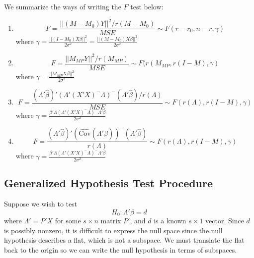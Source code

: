 \documentclass[12pt]{article}
\newcommand{\Cov}{\mathrm{Cov}}
\newcommand{\bhat}{\hat{\beta}}
\numberwithin{equation}{section}
\begin{document}
We summarize the ways of writing the $F$ test below:
\begin{enumerate}
  \item \begin{equation*}
    F = \frac{||(M - M_0) Y||^2 / r(M - M_0)}{MSE}
      \sim F(r - r_0, n - r, \gamma)
  \end{equation*}
  where $\gamma = \frac{||(I - M_0) X \beta||^2}{2 \sigma^2}
    = \frac{||(M - M_0) X \beta||^2}{2 \sigma^2}$
  \item \begin{equation*}
    F = \frac{||M_{MP}Y||^2 / r(M_{MP})}{MSE}
      \sim F(r(M_{MP}, r(I - M), \gamma)
  \end{equation*}
  where $\gamma = \frac{||M_{MP} X \beta||^2}{2 \sigma^2}$
  \item \begin{equation*}
    F = \frac{(\Lambda' \bhat)' (\Lambda' (X'X)^{-} \Lambda)^{-} (\Lambda' \bhat) / r(\Lambda)}{MSE}
      \sim F(r(\Lambda), r(I - M), \gamma)
  \end{equation*}
  where $\gamma = \frac{\beta' \Lambda (\Lambda' (X'X)^{-} \Lambda)^{-} \Lambda'\beta}{2 \sigma^2}$
  \item \begin{equation*}
    F = \frac{(\Lambda'\bhat)' (\widehat{\Cov}(\Lambda' \bhat))^{-} (\Lambda' \bhat)}{r(\Lambda)}
    \sim F(r(\Lambda), r(I - M), \gamma)
  \end{equation*}
  where $\gamma = \frac{\beta' \Lambda (\Lambda' (X'X)^{-} \Lambda)^{-} \Lambda' \beta}{2 \sigma^2}$
\end{enumerate}












\subsection{Generalized Hypothesis Test Procedure}
Suppose we wish to test
\begin{equation*}
  H_0: \Lambda'\beta = d
\end{equation*}
where $\Lambda' = P'X$ for some $s \times n$ matrix $P'$, and $d$ is a known $s \times 1$ vector. Since $d$ is possibly nonzero, it is difficult to express the null space since the null hypothesis describes a flat, which is not a subspace. We must translate the flat back to the origin so we can write the null hypothesis in terms of subspaces.
\end{document}
